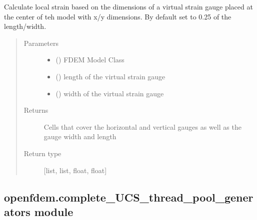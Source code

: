 \documentclass[letterpaper,10pt,english]{sphinxmanual}
\begin{document}
\begin{fulllineitems}
\label{\detokenize{openfdem:openfdem.complete_BD_thread_pool_generators.set_strain_gauge}}
Calculate local strain based on the dimensions of a virtual strain gauge placed at the center of teh model with
x/y dimensions. By default set to 0.25 of the length/width.
\begin{quote}\begin{description}
\item[{Parameters}] \leavevmode\begin{itemize}
\item {} 
 ({\hyperref[\detokenize{openfdem:openfdem.openfdem.Model}]{}}) \textendash{} FDEM Model Class

\item {} 
 () \textendash{} length of the virtual strain gauge

\item {} 
 () \textendash{} width of the virtual strain gauge

\end{itemize}

\item[{Returns}] \leavevmode
Cells that cover the horizontal and vertical gauges as well as the gauge width and length

\item[{Return type}] \leavevmode
{[}list, list, float, float{]}

\end{description}\end{quote}

\end{fulllineitems}



\subsection{openfdem.complete\_UCS\_thread\_pool\_generators module}
\label{\detokenize{openfdem:module-openfdem.complete_UCS_thread_pool_generators}}\label{\detokenize{openfdem:openfdem-complete-ucs-thread-pool-generators-module}}
\end{document}
